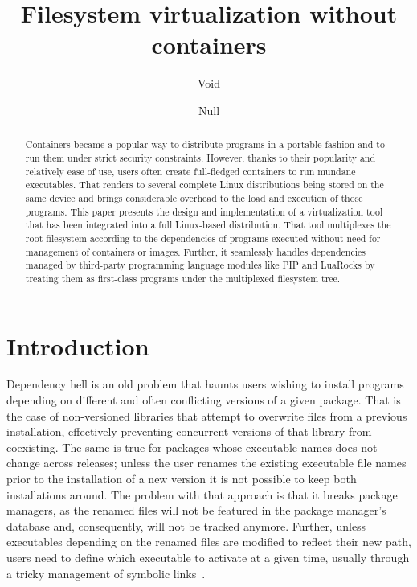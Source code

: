 \documentclass[sigplan, anonymous, 10pt]{acmart}
\begin{document}
\title{Filesystem virtualization without containers}

\author{Void}

\author{Null}

\renewcommand{\shortauthors}{Void et al.}

\begin{abstract}
Containers became a popular way to distribute programs in a portable fashion and to run them
under strict security constraints. However, thanks to their popularity and relatively ease
of use, users often create full-fledged containers to run mundane executables. That renders to
several complete Linux distributions being stored on the same device and brings considerable
overhead to the load and execution of those programs. This paper presents the design and
implementation of a virtualization tool that has been integrated into a full Linux-based
distribution. That tool multiplexes the root filesystem according to the dependencies of programs
executed without need for management of containers or images. Further, it seamlessly handles
dependencies managed by third-party programming language modules like PIP and LuaRocks by treating
them as first-class programs under the multiplexed filesystem tree.
\end{abstract}

\maketitle

\section{Introduction}
Dependency hell is an old problem that haunts users wishing to install programs depending on
different and often conflicting versions of a given package. That is the case of non-versioned
libraries that attempt to overwrite files from a previous installation, effectively preventing
concurrent versions of that library from coexisting. The same is true for packages whose executable
names does not change across releases; unless the user renames the existing executable file names
prior to the installation of a new version it is not possible to keep both installations around.
The problem with that approach is that it breaks package managers, as the renamed files will not
be featured in the package manager's database and, consequently, will not be tracked anymore. Further, 
unless executables depending on the renamed files are modified to reflect their new path, users need
to define which executable to activate at a given time, usually through a tricky management of
symbolic links~\cite{RHEL?}.
\end{document}
